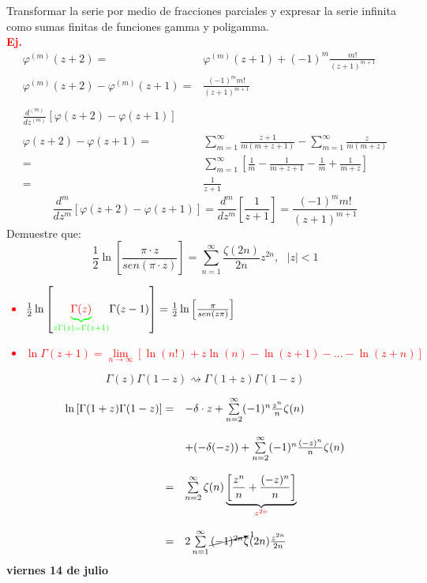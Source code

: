 \documentclass{article}
\theoremstyle{definition}
\begin{document}
Transformar la serie por medio de fracciones parciales y expresar la serie infinita como sumas finitas de funciones gamma y poligamma.\\
\textbf{\textcolor{red}{Ej.}}
\[
\begin{array}{rl}
	\varphi ^{(m)} (z+2)=& \varphi^{(m)} (z+1)+(-1)^{m}\frac{m!}{(z+1)^{m+1}}\\
	\varphi^{(m)} (z+2)-\varphi^{(m)} (z+1)=& \frac{(-1)^mm!}{(z+1)^{m+1}}\\
	\\
	\frac{d^{(m)}}{dz^{(m)}}\left[\varphi (z+2) -\varphi (z+1)\right]\\
	\\
	\varphi (z+2) - \varphi (z+1)=&\sum^{\infty}_{m=1}\frac{z+1}{m(m+z+1)}-\sum^{\infty}_{m=1}\frac{z}{m(m+z)}\\
	=& \sum^{\infty}_{m=1}\left[\frac{1}{m}-\frac{1}{m+z+1}-\frac{1}{m}+\frac{1}{m+z}\right]\\
	=& \frac{1}{z+1}
\end{array}
\]
\[\frac{d^m}{dz^m}\left[\varphi (z+2)-\varphi (z+1)\right] = \frac{d^m}{dz^m}\left[\frac{1}{z+1}\right]=\frac{(-1)^mm!}{(z+1)^{m+1}}\]
Demuestre que:
\[\frac{1}{2}\ln \left[\frac{\pi\cdot z}{sen(\pi\cdot z)}\right]=\sum^{\infty}_{n=1}\frac{\zeta (2n)}{2n}z^{2n},\ \ \ |z|<1\]
\textcolor{red}{
\begin{itemize}
	\item $\frac{1}{2}\ln\left[\textcolor{green}{\underbrace{\textcolor{red}{\Gamma (z)}}_{z\Gamma (z)=\Gamma (z+1)}}\Gamma (z-1)\right]=\frac{1}{2}\ln\left[\frac{\pi}{sen(z\pi)}\right]$
	\item $\ln \Gamma (z+1) =\lim\limits_{n\to \infty}\left[\ln (n!)+z\ln (n)-\ln (z+1)-...-\ln (z+n)\right]$
\end{itemize}
}
\[\Gamma (z)\Gamma (1-z)\rightsquigarrow\Gamma (1+z)\Gamma (1-z)\]

\[
\begin{array}{rl}
	\ln\left[\Gamma (1+z)\Gamma (1-z)\right]=& -\delta\cdot z +\sum\limits^{\infty}_{n=2}(-1)^n\frac{z^n}{n}\zeta (n)\\
	\\
	&+(-\delta(-z))+\sum\limits^{\infty}_{n=2}(-1)^n\frac{(-z)^n}{n}\zeta (n)\\
	\\
	=&\sum\limits^{\infty}_{n=2}\zeta (n)\underbrace{\left[\frac{z^n}{n}+\frac{(-z)^n}{n}\right]}_{\textcolor{red}{z^{2n}}}\\
	\\
	=& 2\sum\limits^{\infty}_{n=1}\cancelto{1}{(-1)^{2n}}\zeta (2n)\frac{z^{2n}}{2n}
\end{array}
\]
\newpage
\textbf{viernes 14 de julio}
\end{document}
